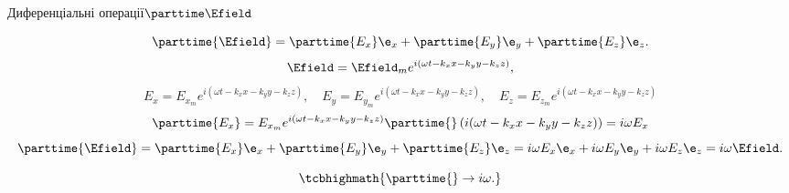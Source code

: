 \documentclass{beamer}
\begin{document}
\begin{frame}{Диференціальні операції}{$\parttime\Efield$}
       \begin{block}{}
        \begin{equation*}
    \parttime{\Efield} = \parttime{E_x}\e_x + \parttime{E_y}\e_y + \parttime{E_z}\e_z.
\end{equation*}
\begin{equation*}
    \Efield = \Efield_me^{i(\omega t - k_xx - k_yy - k_zz)},
\end{equation*}
\begin{equation*}
    E_x = E_{x_m}e^{i(\omega t - k_xx - k_yy - k_zz)}, \quad
    E_y = E_{y_m}e^{i(\omega t - k_xx - k_yy - k_zz)}, \quad
    E_z = E_{z_m}e^{i(\omega t - k_xx - k_yy - k_zz)}
\end{equation*}
\begin{equation*}
    \parttime{E_x} = E_{x_m} e^{i(\omega t - k_xx - k_yy - k_zz)} \parttime{} \left(
    i(\omega t -
    k_xx - k_yy - k_zz) \right) = i\omega E_x
\end{equation*}
        \begin{equation*}
    \parttime{\Efield} = \parttime{E_x}\e_x + \parttime{E_y}\e_y + \parttime{E_z}\e_z = i\omega E_x\e_x + i\omega E_y\e_y + i\omega E_z\e_z =
    i\omega\Efield.
\end{equation*}
\end{block}
\begin{block}{}
    \begin{equation*}
    \tcbhighmath{\parttime{}  \to  i\omega.}
\end{equation*}
\end{block}
\end{frame}
\end{document}
